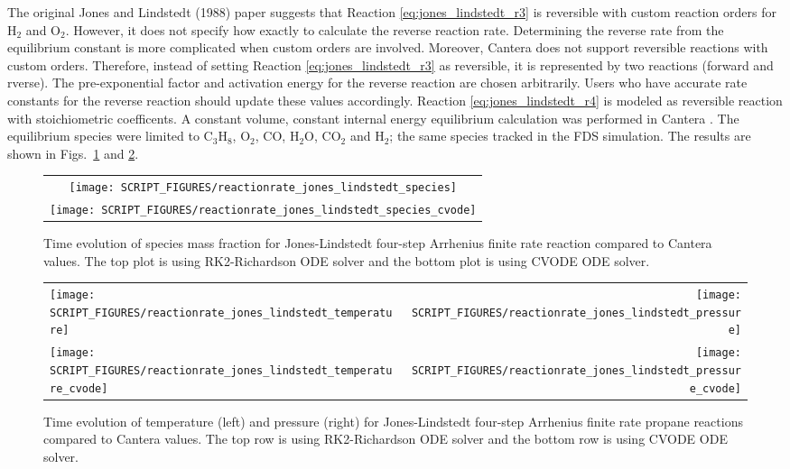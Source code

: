 \documentclass[11pt]{book}
\begin{document}
The original Jones and Lindstedt (1988) paper \cite{Jones_Lindstedt:1988} suggests that Reaction \ref{eq:jones_lindstedt_r3} is reversible with custom reaction orders for $\mathrm{H_2}$ and $\mathrm{O_2}$. However, it does not specify how exactly to calculate the reverse reaction rate. Determining the reverse rate from the equilibrium constant is more complicated when custom orders are involved. Moreover, Cantera does not support reversible reactions with custom orders. Therefore, instead of setting  Reaction \ref{eq:jones_lindstedt_r3} as reversible, it is represented by two reactions (forward and rverse). The pre-exponential factor and activation energy for the reverse reaction are chosen arbitrarily. Users who have accurate rate constants for the reverse reaction should update these values accordingly. Reaction \ref{eq:jones_lindstedt_r4} is modeled as reversible reaction with stoichiometric coefficents. A constant volume, constant internal energy equilibrium calculation was performed in Cantera \cite{cantera:2023}. The equilibrium species were limited to $\mathrm{C_3H_8}$, $\mathrm{O_2}$, $\mathrm{CO}$, $\mathrm{H_2O}$, $\mathrm{CO_2}$ and $\mathrm{H_2}$; the same species tracked in the FDS simulation.  The results are shown in Figs.~\ref{fig:jones_lindstedt_species} and \ref{fig:jones_lindstedt_PT}.

\begin{figure}[h!]
\centering
\begin{tabular}{c}
\texttt{[image: SCRIPT\_FIGURES/reactionrate\_jones\_lindstedt\_species]} \\
\texttt{[image: SCRIPT\_FIGURES/reactionrate\_jones\_lindstedt\_species\_cvode]}
\end{tabular}
\caption[Species evolution in Jones-Lindstedt case]{Time evolution of species mass fraction for Jones-Lindstedt four-step Arrhenius finite rate reaction compared to Cantera values. The top plot is using RK2-Richardson ODE solver and the bottom plot is using CVODE ODE solver.}
\label{fig:jones_lindstedt_species}
\end{figure}

\begin{figure}[ht]
\begin{tabular*}{\textwidth}{lr}
\texttt{[image: SCRIPT\_FIGURES/reactionrate\_jones\_lindstedt\_temperature]} &
\texttt{[image: SCRIPT\_FIGURES/reactionrate\_jones\_lindstedt\_pressure]} \\
\texttt{[image: SCRIPT\_FIGURES/reactionrate\_jones\_lindstedt\_temperature\_cvode]} &
\texttt{[image: SCRIPT\_FIGURES/reactionrate\_jones\_lindstedt\_pressure\_cvode]} \\
\end{tabular*}
\caption[Temperature and pressure evolution for Jones-Lindstedt case]{Time evolution of temperature (left) and pressure (right) for Jones-Lindstedt four-step Arrhenius finite rate propane reactions compared to Cantera values. The top row is using RK2-Richardson ODE solver and the bottom row is using CVODE ODE solver.}
\label{fig:jones_lindstedt_PT}
\end{figure}
\end{document}
